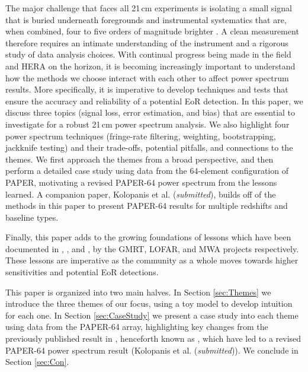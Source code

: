 \documentclass[preprint2,numberedappendix,tighten]{aastex6}  %
\begin{document}
The major challenge that faces all 21\,cm experiments is isolating a small signal that is buried underneath foregrounds and 
instrumental systematics that are, when combined, four to five orders of magnitude brighter \citep[e.g.,][]{santos_et_al2005, ali_et_al2008, deOliveiraCosta_et_al2008, jelic_et_al2008, bernardi_et_al2009, bernardi_et_al2010, ghosh_et_al2011, pober_et_al2013, bernardi_et_al2013, dillon_et_al2014, kohn_et_al2016}. A clean measurement therefore requires an intimate understanding of the instrument and a rigorous study of data analysis choices. With continual progress being made 
in the field and HERA on the horizon, it is becoming increasingly important to understand how the methods we choose interact 
with each other to affect power spectrum results. More specifically, it is imperative to develop techniques and tests that ensure 
the accuracy and reliability of a potential EoR detection. In this paper, we discuss three topics (signal loss, error estimation, and bias) that are essential to investigate 
for a robust 21\,cm power spectrum analysis. We also highlight four power spectrum techniques (fringe-rate filtering, weighting, bootstrapping, jackknife testing) and their trade-offs, potential 
pitfalls, and connections to the themes. We first approach the themes from a broad perspective, and then perform a detailed 
case study using data from the 64-element configuration of PAPER, motivating a revised PAPER-64 power spectrum 
from the lessons learned. A companion paper, Kolopanis et al. (\textit{submitted}), builds off of the methods in this paper to present PAPER-64 results for multiple redshifts and baseline types.

Finally, this paper adds to the growing foundations of lessons which have been documented in \citet{Paciga2013}, \citet{Patil2016}, and \citet{Jacobs2016}, by the GMRT, LOFAR, and MWA projects respectively. These lessons are imperative as the community as a whole moves towards higher sensitivities and potential EoR detections.

This paper is organized into two main halves. In Section \ref{sec:Themes} we introduce the three themes of our focus, using a 
toy model to develop intuition for each one. In Section \ref{sec:CaseStudy} we present a case study into each theme using data 
from the PAPER-64 array, highlighting key changes from the previously published result in \citet{ali_et_al2015}, henceforth known as , which have led to a 
revised PAPER-64 power spectrum result (Kolopanis et al. (\textit{submitted})). We conclude in Section \ref{sec:Con}.
\end{document}
